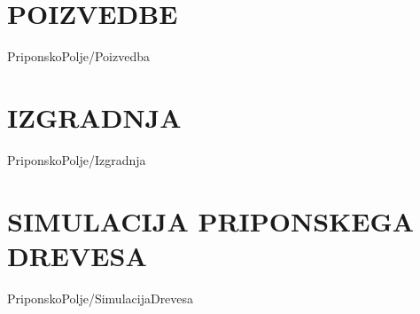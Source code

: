 
\section{POIZVEDBE}\label{sec:SAPoizvedbe}
{PriponskoPolje/Poizvedba}


\section{IZGRADNJA}\label{sec:SAIzgradnja}
{PriponskoPolje/Izgradnja}




\section{SIMULACIJA PRIPONSKEGA DREVESA}\label{sec:STsimulacija}
{PriponskoPolje/SimulacijaDrevesa}